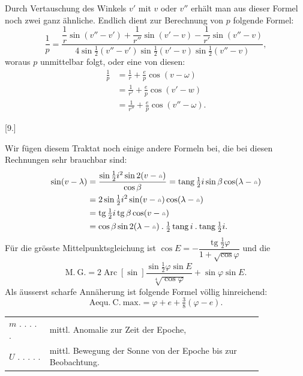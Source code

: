 Durch Vertauschung des Winkels $v'$ mit $v$ oder $v''$ erhält man aus dieser Formel noch zwei ganz ähnliche. Endlich dient zur Berechnung von $p$ folgende Formel:
\[
\frac1p=\frac{\dfrac1r\sin(v''-v')+\dfrac1{r''}\sin(v'-v)-\dfrac1{r'}\sin(v''-v)}
{4\sin\tfrac12(v''-v')\sin\tfrac12(v'-v)\sin\tfrac12(v''-v)},
\]
\noindent woraus $p$ unmittelbar folgt, oder eine von diesen:
\[
\begin{aligned}
\frac1p&=\frac1r+\frac ep\cos(v-\omega)\\
&=\frac1{r'}+\frac ep\cos(v'-w)\\
&=\frac1{r''}+\frac ep\cos(v''-\omega).
\end{aligned}
\]
\begin{center}[9.]\end{center}
\noindent{\small [S. 8]}\par
\noindent\hspace*{\parindent}Wir fügen diesem Traktat noch einige andere Formeln bei, die bei diesen Rechnungen sehr brauchbar sind:
\[
\begin{aligned}
\sin(v-\lambda)&=\frac{\sin\tfrac12i^2\sin2(v-\AstNode)}{\cos\beta}
=\operatorname{tang}\tfrac12i\sin\beta\cos(\lambda-\AstNode)\\
&=2\sin\tfrac12i^2\sin(v-\AstNode)\cos(\lambda-\AstNode)\\
&=\operatorname{tg}\tfrac12i\operatorname{tg}\beta\cos(v-\AstNode)\\
&=\cos\beta\sin2(\lambda-\AstNode)\mathbin{.}\tfrac12\operatorname{tang}i\mathbin{.}\operatorname{tang}\tfrac12i.
\end{aligned}
\]
\noindent Für die grösste Mittelpunktsgleichung ist $\cos E=-\dfrac{\operatorname{tg}\tfrac12\varphi}{1+\surd\cos\varphi}$ und die
\[
\mathrm{M.\ G.}=2\operatorname{Arc}[\sin]\frac{\sin\tfrac12\varphi\sin E}{\sqrt[4]{\cos\varphi}}+\sin\varphi\sin E.
\]
\noindent Als äusserst scharfe Annäherung ist folgende Formel völlig hinreichend:
\[
\mathrm{Aequ.\ C.\ max.}=\varphi+e+\tfrac38(\varphi-e).
\]
\clearpage
{}
\begin{center}\end{center}
\noindent\begin{tabular}{@{}l@{\quad}p{0.84\linewidth}@{}}
$m$ . . . . . & mittl. Anomalie zur Zeit der Epoche,\\
$U$ . . . . . & mittl. Bewegung der Sonne von der Epoche bis zur Beobachtung.
\end{tabular}
